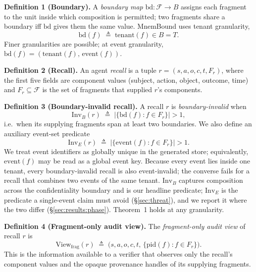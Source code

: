 \documentclass[conference,compsoc]{IEEEtran}
\begin{document}
\textbf{Definition 1 (Boundary).} A \emph{boundary map} $\mathrm{bd} : \mathcal{F} \to B$ assigns each fragment to the unit inside which composition is permitted; two fragments share a boundary iff $\mathrm{bd}$ gives them the same value. MnemBound uses tenant granularity,
\begin{equation}
\mathrm{bd}(f) \;\triangleq\; \mathrm{tenant}(f) \in B = T.
\end{equation}
Finer granularities are possible; at event granularity, $\mathrm{bd}(f) = (\mathrm{tenant}(f),\,\mathrm{event}(f))$.

\textbf{Definition 2 (Recall).} An agent \emph{recall} is a tuple $r = (s, a, o, c, t, F_{r})$, where the first five fields are component values (subject, action, object, outcome, time) and $F_{r} \subseteq \mathcal{F}$ is the set of fragments that supplied $r$'s components.

\textbf{Definition 3 (Boundary-invalid recall).} A recall $r$ is \emph{boundary-invalid} when
\begin{equation}
\mathrm{Inv}_{B}(r) \;\triangleq\; \bigl|\{\mathrm{bd}(f) : f \in F_{r}\}\bigr| > 1, \label{eq:inv-b}
\end{equation}
i.e.\ when its supplying fragments span at least two boundaries. We also define an auxiliary event-set predicate
\begin{equation}
  \mathrm{Inv}_{E}(r) \;\triangleq\; \bigl|\{\mathrm{event}(f) : f \in F_{r}\}\bigr| > 1. \label{eq:inv-e}
\end{equation}
We treat event identifiers as globally unique in the generated store; equivalently, $\mathrm{event}(f)$ may be read as a global event key. Because every event lies inside one tenant, every boundary-invalid recall is also event-invalid; the converse fails for a recall that combines two events of the same tenant. $\mathrm{Inv}_{B}$ captures composition across the confidentiality boundary and is our headline predicate; $\mathrm{Inv}_{E}$ is the predicate a single-event claim must avoid (\S\ref{sec:threat}), and we report it where the two differ (\S\ref{sec:results:phase}). Theorem~1 holds at any granularity.

\textbf{Definition 4 (Fragment-only audit view).} The \emph{fragment-only audit view} of recall $r$ is
\begin{equation}
\mathrm{View}_{\mathrm{frag}}(r) \;\triangleq\; \bigl(s, a, o, c, t,\, \{\mathrm{pid}(f) : f \in F_{r}\}\bigr).
\end{equation}
This is the information available to a verifier that observes only the recall's component values and the opaque provenance handles of its supplying fragments.
\end{document}
